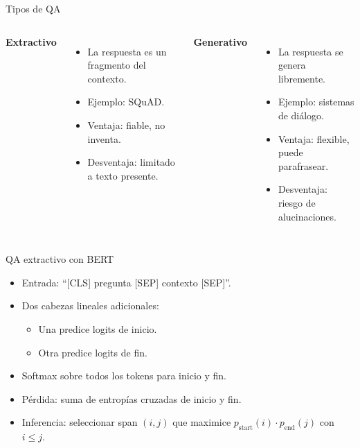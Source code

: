 \documentclass[aspectratio=169, 10pt, xcolor=table]{beamer}
\begin{document}
\begin{frame}{Tipos de QA}
    \begin{columns}[t]
        \textbf{Extractivo}
        \begin{itemize}
            \item La respuesta es un fragmento del contexto.
            \item Ejemplo: SQuAD.
            \item Ventaja: fiable, no inventa.
            \item Desventaja: limitado a texto presente.
        \end{itemize}
        \textbf{Generativo}
        \begin{itemize}
            \item La respuesta se genera libremente.
            \item Ejemplo: sistemas de diálogo.
            \item Ventaja: flexible, puede parafrasear.
            \item Desventaja: riesgo de alucinaciones.
        \end{itemize}
    \end{columns}
\end{frame}

\begin{frame}{QA extractivo con BERT}
    \begin{itemize}
        \item Entrada: ``[CLS] pregunta [SEP] contexto [SEP]''.
        \item Dos cabezas lineales adicionales:
        \begin{itemize}
            \item Una predice logits de inicio.
            \item Otra predice logits de fin.
        \end{itemize}
        \item Softmax sobre todos los tokens para inicio y fin.
        \item Pérdida: suma de entropías cruzadas de inicio y fin.
        \item Inferencia: seleccionar span $(i,j)$ que maximice $p_{\text{start}}(i) \cdot p_{\text{end}}(j)$ con $i \le j$.
    \end{itemize}
\end{frame}
\end{document}
